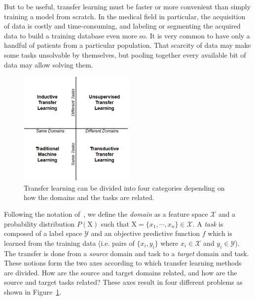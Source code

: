 But to be useful, transfer learning must be faster or more convenient than simply training a model from scratch. In the medical field in particular, the acquisition of data is costly and time-consuming, and labeling or segmenting the acquired data to build a training database even more so. It is very common to have only a handful of patients from a particular population. That scarcity of data may make some tasks unsolvable by themselves, but pooling together every available bit of data may allow solving them. 

\begin{figure}[htb]
    \centering
	\includegraphics[width=0.5\textwidth]{img_transfer/transfer_types.png}
    \caption[Transfer learning categories]{Transfer learning can be divided into four categories depending on how the domains and the tasks are related.}
    \label{fig:transfer_types}
\end{figure}

Following the notation of~\textcite{pan2010TNDE}, we define the \textit{domain} as a feature space $\mathcal{X}$ and a probability distribution $P\left( \mathrm{X} \right)$ such that $\mathrm{X} = \{ x_1, \cdots, x_n \} \in \mathcal{X}$. A \textit{task} is composed of a label space $\mathcal{Y}$ and an objective predictive function $f$ which is learned from the training data (i.e. pairs of $\{ x_i, y_i \}$ where $x_i \in \mathcal{X}$ and $y_i \in \mathcal{Y}$). The transfer is done from a \textit{source} domain and task to a \textit{target} domain and task. These notions form the two axes according to which transfer learning methods are divided. How are the source and target domains related, and how are the source and target tasks related? These axes result in four different problems as shown in Figure~\ref{fig:transfer_types}. 

